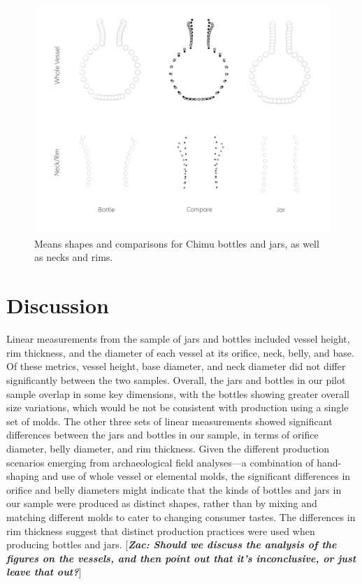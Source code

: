 \documentclass[]{interact}
\theoremstyle{plain}%
\theoremstyle{definition}
\theoremstyle{remark}
\begin{document}
\begin{figure}\centering
\includegraphics[width=\linewidth]{figs/mshape.compare.png}
\caption{Means shapes and comparisons for Chimu bottles and jars, as well as necks and rims. }
\label{fig:mshape}
\end{figure}

\hypertarget{discussion}{%
\section{Discussion}\label{discussion}}

Linear measurements from the sample of jars and bottles included vessel
height, rim thickness, and the diameter of each vessel at its orifice,
neck, belly, and base. Of these metrics, vessel height, base diameter,
and neck diameter did not differ significantly between the two samples.
Overall, the jars and bottles in our pilot sample overlap in some key
dimensions, with the bottles showing greater overall size variations,
which would be not be consistent with production using a single set of
molds. The other three sets of linear measurements showed significant
differences between the jars and bottles in our sample, in terms of
orifice diameter, belly diameter, and rim thickness. Given the different
production scenarios emerging from archaeological field analyses---a
combination of hand-shaping and use of whole vessel or elemental molds,
the significant differences in orifice and belly diameters might
indicate that the kinds of bottles and jars in our sample were produced
as distinct shapes, rather than by mixing and matching different molds
to cater to changing consumer tastes. The differences in rim thickness
suggest that distinct production practices were used when producing
bottles and jars. {[}\emph{\textbf{Zac: Should we discuss the analysis
of the figures on the vessels, and then point out that it's
inconclusive, or just leave that out?}}{]}
\end{document}
